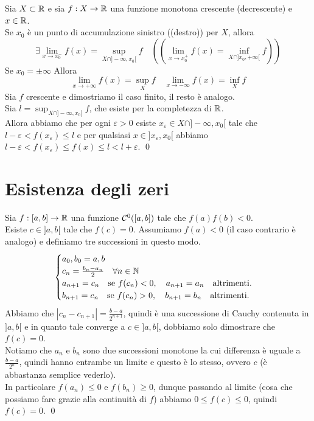 \documentclass[openany]{book}
\begin{document}
\begin{theorem}{}{}
    Sia $X\subset\mathbb{R}$ e sia $f:X\to \mathbb{R}$ una funzione monotona crescente (decrescente) e $x \in \mathbb{R}$.\\
    Se $x_0$ è un punto di accumulazione sinistro ((destro)) per $X$, allora \[\exists \lim_{x\to x_0^-} f(x) = \sup_{X\cap ]-\infty, x_0[} f \quad \left(\left(\lim_{x\to x_0^+} f(x) = \inf_{X\cap ]x_0,+\infty[} f\right)\right)\]
    Se $x_0=\pm\infty$ Allora
    \[\lim_{x\to+\infty} f(x) = \sup_X f \quad \lim_{x\to-\infty} f(x) = \inf_X f\]
    \proof 
    Sia $f$ crescente e dimostriamo il caso finito, il resto è analogo.\\
    Sia $l = \sup_{X\cap]-\infty, x_0[ }f$, che esiste per la completezza di $\mathbb{R}$.\\
    Allora abbiamo che per ogni $\varepsilon >0$ esiste $x_\varepsilon \in X\cap]-\infty, x_0[$ tale che $l-\varepsilon < f(x_\varepsilon)\le l$ e per qualsiasi $x \in ]x_\varepsilon, x_0[$ abbiamo $l-\varepsilon < f(x_\varepsilon) \le f(x) \le l < l+\varepsilon$.
    \qed
\end{theorem}

\section{Esistenza degli zeri}

\begin{theorem}{}{}
    Sia $f: [a,b]\to \mathbb{R}$ una funzione $\mathcal{C}^0([a,b])$ tale che $f(a)f(b)< 0$.\\
    Esiste $c \in ]a,b[$ tale che $f(c)=0$.
    \proof 
    Assumiamo $f(a)<0$ (il caso contrario è analogo) e definiamo tre successioni in questo modo.
    \[\begin{cases}
        a_0, b_0 = a,b\\
        c_n = \frac{b_n - a_n}{2} \quad \forall n\in\mathbb{N}\\
        a_{n+1} = c_n \quad \text{se } f(c_n) < 0, \quad a_{n+1}=a_n \quad \text{altrimenti}.\\
        b_{n+1} = c_n \quad \text{se } f(c_n) > 0, \quad b_{n+1}=b_n \quad \text{altrimenti}.
    \end{cases}\]
    Abbiamo che $|c_n - c_{n+1}| = \frac{b-a}{2^{n+1}}$, quindi è una successione di Cauchy contenuta in $]a,b[$ e in quanto tale converge a $c\in ]a,b[$, dobbiamo solo dimostrare che $f(c)=0$.\\
    Notiamo che $a_n$ e $b_n$ sono due successioni monotone la cui differenza è uguale a $\frac{b-a}{2^n}$, quindi hanno entrambe un limite e questo è lo stesso, ovvero $c$ (è abbastanza semplice vederlo).\\
    In particolare $f(a_n) \le 0$ e $f(b_n)\ge 0$, dunque passando al limite (cosa che possiamo fare grazie alla continuità di $f$) abbiamo $0 \le f(c) \le 0$, quindi $f(c)=0$.
    \qed
\end{theorem}
\end{document}
